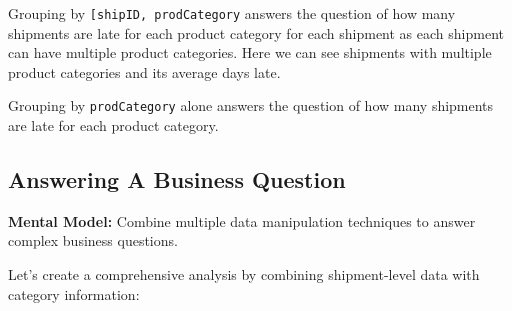 \documentclass[
]{article}
\begin{document}
Grouping by
\texttt{{[}\textquotesingle{}shipID\textquotesingle{},\ \textquotesingle{}prodCategory\textquotesingle{}{]}}
answers the question of how many shipments are late for each product
category for each shipment as each shipment can have multiple product
categories. Here we can see shipments with multiple product categories
and its average days late.

Grouping by \texttt{\textquotesingle{}prodCategory\textquotesingle{}}
alone answers the question of how many shipments are late for each
product category.

\subsection{Answering A Business
Question}\label{answering-a-business-question}

\textbf{Mental Model:} Combine multiple data manipulation techniques to
answer complex business questions.

Let's create a comprehensive analysis by combining shipment-level data
with category information:
\end{document}

